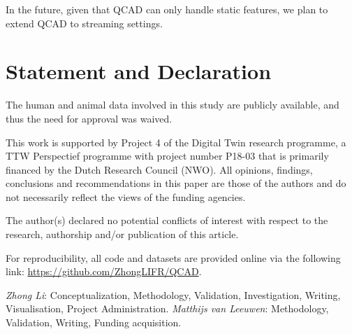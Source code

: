 \documentclass[pdflatex,sn-basic]{sn-jnl}%
\theoremstyle{thmstyleone}%
\theoremstyle{thmstyletwo}%
\theoremstyle{thmstylethree}%
\begin{document}
In the future, given that QCAD can only handle static features, we plan to extend QCAD to streaming settings.
 
\section*{Statement and Declaration}
\backmatter


The human and animal data involved in this study are publicly available, and thus the need for approval was waived.

This work is supported by Project 4 of the Digital Twin research programme, a TTW Perspectief programme with project number P18-03 that is primarily financed by the Dutch Research Council (NWO). All opinions, findings, conclusions and recommendations in this paper are those of the authors and do not necessarily reflect the views of the funding agencies.

 The author(s) declared no potential conflicts of interest with
respect to the research, authorship and/or publication of this
article.

For reproducibility, all code and datasets are provided online via the following link: \href{https://github.com/ZhongLIFR/QCAD}{https://github.com/ZhongLIFR/QCAD}.


\textit{Zhong Li}: Conceptualization, Methodology, Validation, Investigation, Writing, Visualisation, Project Administration. \textit{Matthijs van Leeuwen}: Methodology, Validation, Writing, Funding acquisition.


\end{document}
